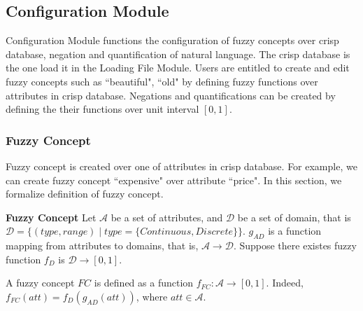 \subsection{Configuration Module}
\label{sec:ConfigurationModule}

Configuration Module functions the configuration of fuzzy concepts over crisp database, negation and quantification of natural language. The crisp database is the one load it in the Loading File Module. Users are entitled to create and edit fuzzy concepts such as ``beautiful", ``old" by defining fuzzy functions over attributes in crisp database. Negations and quantifications can be created by defining the their functions over unit interval $[0,1]$.

\subsubsection{Fuzzy Concept}
Fuzzy concept is created over one of attributes in crisp database. For example, we can create fuzzy concept ``expensive" over attribute ``price". In this section, we formalize definition of fuzzy concept.
\begin{defin} \textbf{Fuzzy Concept}
Let $\mathcal{A}$ be a set of attributes, and $\mathcal{D}$ be a set of domain, that is $\mathcal{D}=\{(type, range) \mid type =\{Continuous, Discrete\}\}$. $g_{AD}$ is a function mapping  from attributes to domains, that is, $\mathcal{A} \rightarrow \mathcal{D}$. Suppose there existes fuzzy function $f_{D}$ is $\mathcal{D} \rightarrow [0,1]$. 

A fuzzy concept $FC$ is defined as a function $f_{FC}: \mathcal{A} \rightarrow [0,1]$. Indeed, $f_{FC}(att)= f_{D}(g_{AD}({att}))$, where $att \in \mathcal{A}$.
\end{defin}

